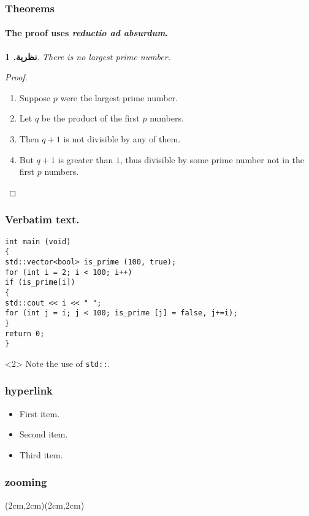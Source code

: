 \documentclass[hyperref=unicode]{beamer}
\newtheorem*{thm}{نظرية.}
\begin{document}
\begin{frame}
\frametitle{Theorems}

\framesubtitle{The proof uses \textit{reductio ad absurdum}.}
\begin{thm}
There is no largest prime number.
\end{thm}
\begin{proof}
\begin{enumerate}[<+-| alert@+>]
\item Suppose $p$ were the largest prime number.
\item Let $q$ be the product of the first $p$ numbers.
\item Then $q+1$ is not divisible by any of them.
\item But $q + 1$ is greater than $1$, thus divisible by some prime
number not in the first $p$ numbers.\qedhere
\end{enumerate}
\end{proof}

\end{frame}



\begin{frame}[fragile]

\frametitle{Verbatim text.}


\begin{verbatim}
int main (void)
{
std::vector<bool> is_prime (100, true);
for (int i = 2; i < 100; i++)
if (is_prime[i])
{
std::cout << i << " ";
for (int j = i; j < 100; is_prime [j] = false, j+=i);
}
return 0;
}
\end{verbatim}
\begin{uncoverenv}<2>
Note the use of \verb|std::|.
\end{uncoverenv}

\end{frame}

\begin{frame}
\frametitle{hyperlink}
\begin{itemize}
\item<1-> First item.
\item<2-> Second item.
\item<3-> Third item.
\end{itemize}
\hyperlink{jumptosecond}{}
\hypertarget<2>{jumptosecond}{}
\end{frame}
\begin{frame}
\frametitle{zooming}

(2cm,2cm)(2cm,2cm)

\end{frame}
\end{document}
